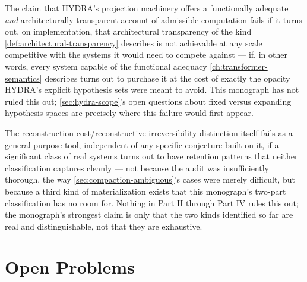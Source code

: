 \documentclass[11pt]{book}
\theoremstyle{plain}
\theoremstyle{definition}
\theoremstyle{remark}
\begin{document}
The claim that HYDRA's projection machinery offers a functionally
adequate \emph{and} architecturally transparent account of admissible
computation fails if it turns out, on implementation, that
architectural transparency of the kind \cref{def:architectural-transparency}
describes is not achievable at any scale competitive with the systems
it would need to compete against --- if, in other words, every system
capable of the functional adequacy \cref{ch:transformer-semantics}
describes turns out to purchase it at the cost of exactly the
opacity HYDRA's explicit hypothesis sets were meant to avoid. This
monograph has not ruled this out; \cref{sec:hydra-scope}'s open
questions about fixed versus expanding hypothesis spaces are precisely
where this failure would first appear.

The reconstruction-cost/reconstructive-irreversibility distinction
itself fails as a general-purpose tool, independent of any specific
conjecture built on it, if a significant class of real systems turns
out to have retention patterns that neither classification captures
cleanly --- not because the audit was insufficiently thorough, the way
\cref{sec:compaction-ambiguous}'s cases were merely difficult, but
because a third kind of materialization exists that this monograph's
two-part classification has no room for. Nothing in Part II through
Part IV rules this out; the monograph's strongest claim is only that
the two kinds identified so far are real and distinguishable, not that
they are exhaustive.

\section{Open Problems}
\end{document}
